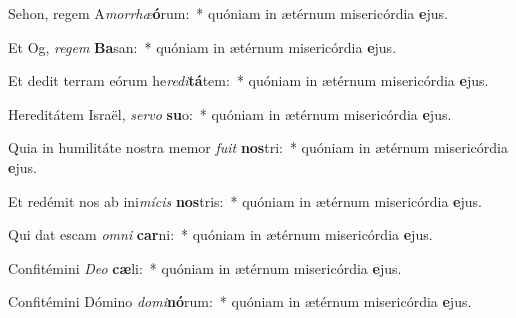 \item Sehon, regem A\textit{mor}\textit{rhæ}\textbf{ó}rum:~* quóniam in ætérnum misericórdia \textbf{e}jus.
\item Et Og, \textit{re}\textit{gem} \textbf{Ba}san:~* quóniam in ætérnum misericórdia \textbf{e}jus.
\item Et dedit terram eórum he\textit{re}\textit{di}\textbf{tá}tem:~* quóniam in ætérnum misericórdia \textbf{e}jus.
\item Hereditátem Israël, \textit{ser}\textit{vo} \textbf{su}o:~* quóniam in ætérnum misericórdia \textbf{e}jus.
\item Quia in humilitáte nostra memor \textit{fu}\textit{it} \textbf{nos}tri:~* quóniam in ætérnum misericórdia \textbf{e}jus.
\item Et redémit nos ab ini\textit{mí}\textit{cis} \textbf{nos}tris:~* quóniam in ætérnum misericórdia \textbf{e}jus.
\item Qui dat escam \textit{om}\textit{ni} \textbf{car}ni:~* quóniam in ætérnum misericórdia \textbf{e}jus.
\item Confitémini \textit{De}\textit{o} \textbf{cæ}li:~* quóniam in ætérnum misericórdia \textbf{e}jus.
\item Confitémini Dómino \textit{do}\textit{mi}\textbf{nó}rum:~* quóniam in ætérnum misericórdia \textbf{e}jus.

